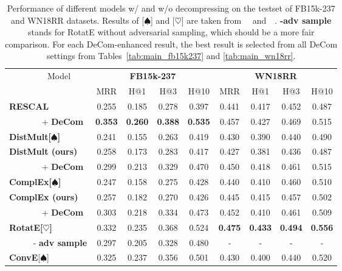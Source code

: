 \documentclass[letterpaper]{article} \usepackage{aaai20}  \usepackage{times}  \usepackage{helvet} \usepackage{courier}  \usepackage{booktabs}
\begin{document}
\begin{table*}[t]
    \centering
    \begin{tabular}{|l|cccc|cccc|}
    \toprule
        \multirow{2}{*}{~~~~~~~~~Model} &  \multicolumn{4}{|c|}{\textbf{FB15k-237}} &  \multicolumn{4}{|c|}{\textbf{WN18RR}} \\
         &  MRR & H@1 & H@3&  H@10&  MRR & H@1 & H@3 & H@10\\
        \midrule
        \textbf{RESCAL} & 0.255 & 0.185 & 0.278 & 0.397 & 0.441 & 0.417 & 0.452 & 0.487\\
        ~~~~~~~ + \textbf{DeCom} & \textbf{0.353} & \textbf{0.260} & \textbf{0.388} & \textbf{0.535}  & 0.457 & 0.427 & 0.469 & 0.515\\
        \midrule
        \textbf{DistMult[$\spadesuit$]} & 0.241 & 0.155 & 0.263 & 0.419 & 0.430 & 0.390 & 0.440 & 0.490\\
        \textbf{DistMult (ours)} & 0.258 & 0.173 & 0.283 & 0.417 & 0.427 & 0.381 & 0.436 & 0.487\\
        ~~~~~~~ + \textbf{DeCom} & 0.299 & 0.213 & 0.329 & 0.470 & 0.450 & 0.418 & 0.461 & 0.515 \\
        \midrule
        \textbf{ComplEx[$\spadesuit$]} & 0.247 & 0.158 & 0.275 & 0.428 & 0.440 & 0.410 & 0.460 & 0.510\\
        \textbf{ComplEx (ours)} & 0.257 & 0.182 & 0.270& 0.426& 0.445 & 0.415 & 0.457 & 0.502\\
        ~~~~~~~ + \textbf{DeCom} & 0.303 & 0.218 & 0.334 & 0.473& 0.452 & 0.410 & 0.461 & 0.509\\
        \midrule
        \textbf{RotatE[$\heartsuit$]} & 0.332 & 0.235 & 0.368 & 0.524 & \textbf{0.475} & \textbf{0.433} & \textbf{0.494} & \textbf{0.556}\\
         ~~~~~ - \textbf{adv sample} & 0.297 & 0.205 & 0.328 & 0.480 &- &- &- &-\\
        \midrule
        \textbf{ConvE}[$\spadesuit$] & 0.325 & 0.237 & 0.356 & 0.501 & 0.430 & 0.400 & 0.440 & 0.520\\
        \bottomrule
    \end{tabular}
    \caption{Performance of different models w/ and w/o decompressing on the testset of FB15k-237 and WN18RR datasets. Results of [$\spadesuit$] and [$\heartsuit$] are taken from~\citeauthor{dettmers2018convolutional}~ and~\citeauthor{sun2019rotate}~. \textbf{-adv sample} stands for RotatE without adversarial sampling, which should be a more fair comparison. For each DeCom-enhanced result, the best result is selected from all DeCom settings from Tables~\ref{tab:main_fb15k237} and \ref{tab:main_wn18rr}.}
    \label{tab:main_res}
    \vspace{-3mm}
\end{table*}
\end{document}
